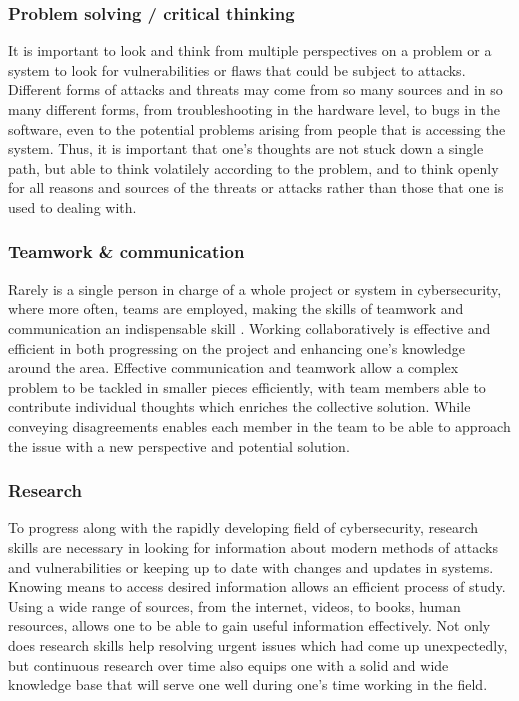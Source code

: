 \documentclass[a4paper, 11pt]{report}
\begin{document}
\subsubsection{Problem solving / critical thinking}
It is important to look and think from multiple perspectives on a problem or a system to look for vulnerabilities or flaws that could be subject to attacks. Different forms of attacks and threats may come from so many sources and in so many different forms, from troubleshooting in the hardware level, to bugs in the software, even to the potential problems arising from people that is accessing the system. Thus, it is important that one’s thoughts are not stuck down a single path, but able to think volatilely according to the problem, and to think openly for all reasons and sources of the threats or attacks rather than those that one is used to dealing with.  
\subsubsection{Teamwork \& communication}
Rarely is a single person in charge of a whole project or system in cybersecurity, where more often, teams are employed, making the skills of teamwork and communication an indispensable skill \cite{liu2017theory}. Working collaboratively is effective and efficient in both progressing on the project and enhancing one’s knowledge around the area. Effective communication and teamwork allow a complex problem to be tackled in smaller pieces efficiently, with team members able to contribute individual thoughts which enriches the collective solution. While conveying disagreements enables each member in the team to be able to approach the issue with a new perspective and potential solution.  

\subsubsection{Research}
To progress along with the rapidly developing field of cybersecurity, research skills are necessary in looking for information about modern methods of attacks and vulnerabilities or keeping up to date with changes and updates in systems. Knowing means to access desired information allows an efficient process of study. Using a wide range of sources, from the internet, videos, to books, human resources, allows one to be able to gain useful information effectively. Not only does research skills help resolving urgent issues which had come up unexpectedly, but continuous research over time also equips one with a solid and wide knowledge base that will serve one well during one’s time working in the field.  
\end{document}
